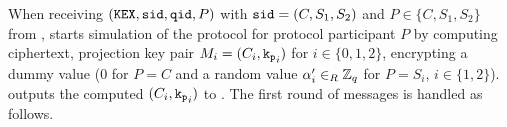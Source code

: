 % 
        When receiving $(\mathtt{KEX}, \mathtt{sid}, \mathtt{qid}, P)$ with $\mathtt{sid}=(C,S_1,S_2)$ and $P\in\{C,S_1,S_2\}$ from \FTWOPAKE, \SIM starts simulation of the protocol for protocol participant $P$ by computing ciphertext, projection key pair $M_i=(C_i, \mathtt{k_p}_i)$ for $i\in\{0,1,2\}$, encrypting a dummy value ($0$ for $P=C$ and a random value $\alpha'_i\in_R\mathbb{Z}_q$ for $P=S_i$, $i\in\{1,2\}$).
        \SIM outputs the computed $(C_i, \mathtt{k_p}_i)$ to \cA.
        The first round of messages is handled as follows.
        
